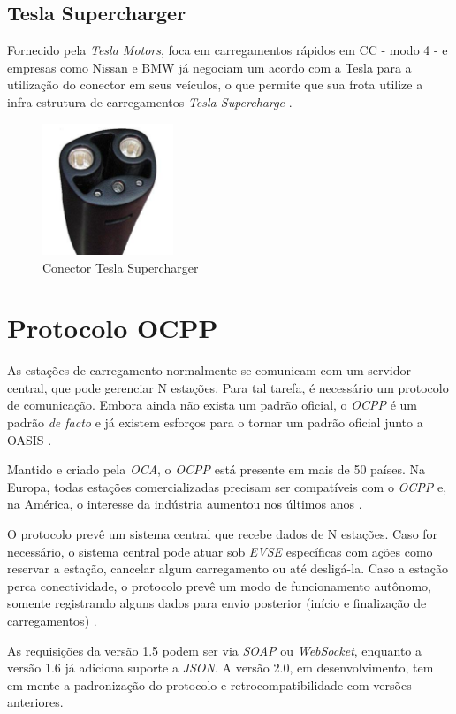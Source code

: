       \subsection{Tesla Supercharger}
      \label{stateofart:plugs:tesla}

        Fornecido pela \textit{Tesla Motors}, foca em carregamentos rápidos em \ac{CC} - modo 4 - e empresas como Nissan e BMW já negociam um acordo com a Tesla para a utilização do conector em seus veículos, o que permite que sua frota utilize a infra-estrutura de carregamentos \textit{Tesla Supercharge} \cite{ieee-review-evse}.

        \begin{figure}[H]
          \begin{center}
            \includegraphics[width=0.35\textwidth,natwidth=300,natheight=300]{assets/images/connectors-tesla.jpg}
            \caption{Conector Tesla Supercharger}
            \label{fig:tesla}
          \end{center}
        \end{figure}

  \section{Protocolo OCPP}
  \label{stateofart:ocpp}

    As estações de carregamento normalmente se comunicam com um servidor central, que pode gerenciar N estações. Para tal tarefa, é necessário um protocolo de comunicação. Embora ainda não exista um padrão oficial, o \textit{\ac{OCPP}} é um padrão \textit{de facto} e já existem esforços para o tornar um padrão oficial junto a \ac{OASIS} \cite{ocpp-news-standardization}.

    Mantido e criado pela \textit{\ac{OCA}}, o \textit{\ac{OCPP}} está presente em mais de 50 países. Na Europa, todas estações comercializadas precisam ser compatíveis com o \textit{\ac{OCPP}} e, na América, o interesse da indústria aumentou nos últimos anos \cite{forbes-news-ocpp}.

    O protocolo prevê um sistema central que recebe dados de N estações. Caso for necessário, o sistema central pode atuar sob \textit{\ac{EVSE}} específicas com ações como reservar a estação, cancelar algum carregamento ou até desligá-la. Caso a estação perca conectividade, o protocolo prevê um modo de funcionamento autônomo, somente registrando alguns dados para envio posterior (início e finalização de carregamentos) \cite{ocpp-spec-15}.

    As requisições da versão 1.5 podem ser via \textit{\ac{SOAP}} ou \textit{WebSocket}, enquanto a versão 1.6 já adiciona suporte a \textit{JSON}. A versão 2.0, em desenvolvimento, tem em mente a padronização do protocolo e retrocompatibilidade com versões anteriores.
